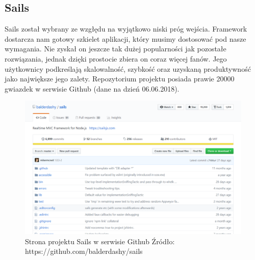 \documentclass[12pt]{report}
\begin{document}
    \subsection{Sails}
      Sails został wybrany ze wzgłędu na wyjątkowo niski próg wejścia.
      Framework dostarcza nam gotowy szkielet aplikacji, który musimy dostosować pod nasze wymagania.
      Nie zyskał on jeszcze tak dużej popularności jak pozostałe rozwiązania, jednak dzięki prostocie zbiera on coraz więcej fanów.
      Jego użytkownicy podkreślają skalowalność, szybkość oraz uzyskaną produktywność jako największe jego zalety.
      Repozytorium projektu posiada prawie 20000 gwiazdek w serwisie Github (dane na dzień 06.06.2018).
      \begin{figure}[!hb]
        \centering
        \includegraphics[width=\textwidth,height=\textheight,keepaspectratio]{sails.png} 
        \caption{Strona projektu Sails w serwisie Github \newline Źródło: https://github.com/balderdashy/sails}
      \end{figure}
\end{document}
